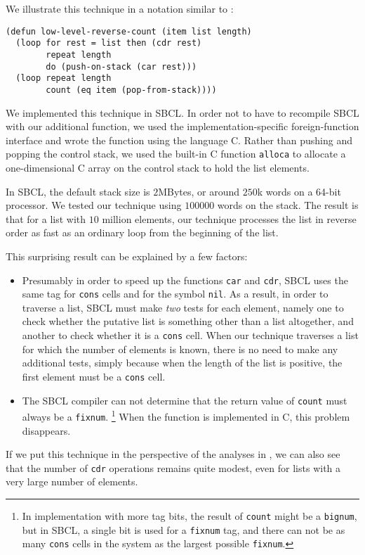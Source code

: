 We illustrate this technique in a notation similar to \commonlisp{}:

{\small\begin{verbatim}
(defun low-level-reverse-count (item list length)
  (loop for rest = list then (cdr rest)
        repeat length
        do (push-on-stack (car rest)))
  (loop repeat length
        count (eq item (pop-from-stack))))
\end{verbatim}}

We implemented this technique in SBCL.  In order not to have to
recompile SBCL with our additional function, we used the
implementation-specific foreign-function interface and wrote the
function using the language C.  Rather than pushing and popping the
control stack, we used the built-in C function \texttt{alloca} to
allocate a one-dimensional C array on the control stack to hold the
list elements.

In SBCL, the default stack size is $2$MBytes, or around $250$k words
on a 64-bit processor.  We tested our technique using $100000$ words
on the stack.  The result is that for a list with $10$ million
elements, our technique processes the list in reverse order as fast as
an ordinary loop from the beginning of the list.

This surprising result can be explained by a few factors:

\begin{itemize}
\item Presumably in order to speed up the functions \texttt{car} and
  \texttt{cdr}, SBCL uses the same tag for \texttt{cons} cells and for
  the symbol \texttt{nil}.  As a result, in order to traverse a list,
  SBCL must make \emph{two} tests for each element, namely one to
  check whether the putative list is something other than a list
  altogether, and another to check whether it is a \texttt{cons}
  cell.  When our technique traverses a list for which the number of
  elements is known, there is no need to make any additional tests,
  simply because when the length of the list is positive, the first
  element must be a \texttt{cons} cell.
\item The SBCL compiler can not determine that the return value of
  \texttt{count} must always be a \texttt{fixnum}.%
  \footnote{In implementation with more tag bits, the result of
    \texttt{count} might be a \texttt{bignum}, but in SBCL, a single
    bit is used for a \texttt{fixnum} tag, and there can not be as
    many \texttt{cons} cells in the system as the largest possible
    \texttt{fixnum}.}
  When the function is implemented in C, this problem disappears.
\end{itemize}

If we put this technique in the perspective of the analyses in
, we can also see that the number of \texttt{cdr}
operations remains quite modest, even for lists with a very large
number of elements.

